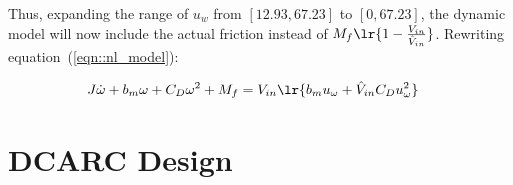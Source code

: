 Thus, expanding the range of $u_w$ from $[12.93, 67.23]$ to $[0, 67.23]$, the
dynamic model will now include the actual friction instead
of $M_f \lr{1 - \frac{V_{in}}{\hat V_{in}}}$. Rewriting equation~(\ref{eqn::nl_model}):

\begin{align}
    &J \dot \omega + b_m \omega + C_D \omega^2 + M_f = V_{in} \lr{b_m u_\omega + \hat V_{in} C_D u_\omega^2}
    \label{eqn::0_mdl}
\end{align}




\section{DCARC Design}







